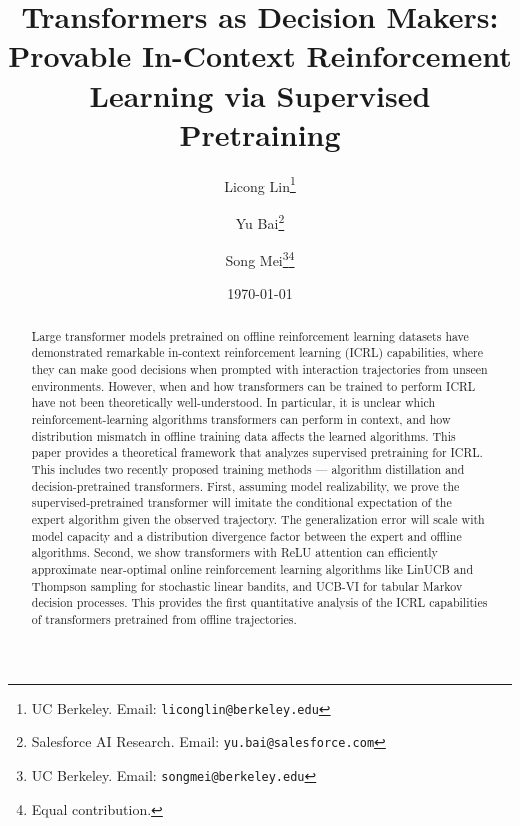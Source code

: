 \documentclass[10pt]{article}
\title{Transformers as Decision Makers: Provable In-Context Reinforcement Learning via Supervised Pretraining}
\date{\today}
\author{
  Licong Lin\thanks{UC Berkeley. Email: \texttt{liconglin@berkeley.edu}}\hspace{.35em}
  \and
  Yu Bai\thanks{Salesforce AI Research. Email: \texttt{yu.bai@salesforce.com}}\hspace{.35em}\footnotemark[4]
  \and
  Song Mei\thanks{UC Berkeley. Email: \texttt{songmei@berkeley.edu}}\hspace{.35em}\thanks{Equal contribution.}
}
\newcommand{\<}{\left\langle}
\renewcommand{\>}{\right\rangle}
\begin{document}
\maketitle
\begin{abstract}
Large transformer models pretrained on offline reinforcement learning datasets have demonstrated remarkable in-context reinforcement learning (ICRL) capabilities, where they can make good decisions when prompted with interaction trajectories from unseen environments. However, when and how transformers can be trained to perform ICRL have not been theoretically well-understood. In particular, it is unclear which reinforcement-learning algorithms transformers can perform in context, and how distribution mismatch in offline training data affects the learned algorithms.
This paper provides a theoretical framework that analyzes supervised pretraining for ICRL. This includes two recently proposed training methods --- algorithm distillation and decision-pretrained transformers. First, assuming model realizability, we prove the supervised-pretrained transformer will imitate the conditional expectation of the expert algorithm given the observed trajectory. The generalization error will scale with model capacity and a distribution divergence factor between the expert and offline algorithms. Second, we show transformers with ReLU attention can efficiently approximate near-optimal online reinforcement learning algorithms like LinUCB and Thompson sampling for stochastic linear bandits, and UCB-VI for tabular Markov decision processes. This provides the first quantitative analysis of the ICRL capabilities of transformers pretrained from offline trajectories.
\end{abstract}
\end{document}
